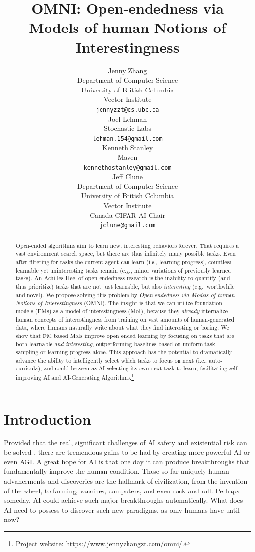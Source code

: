 \documentclass{article} %
\title{OMNI: Open-endedness via Models of human Notions of Interestingness}
\author{Jenny Zhang\\
Department of Computer Science\\
University of British Columbia\\
Vector Institute\\
\texttt{jennyzzt@cs.ubc.ca}\\
\And
Joel Lehman\\
Stochastic Labs\\
\texttt{lehman.154@gmail.com}\quad\quad\quad\quad\quad\quad\quad\\
\And
Kenneth Stanley\\
Maven\\
\texttt{kennethostanley@gmail.com}\\
\And
Jeff Clune\\
Department of Computer Science\\
University of British Columbia\\
Vector Institute\\
Canada CIFAR AI Chair\\
\texttt{jclune@gmail.com}\\
}
\newif\ifcomment
\begin{document}
\commentfalse

\maketitle

\begin{abstract}
Open-ended algorithms aim to learn new, interesting behaviors forever. That requires a vast environment search space, but there are thus infinitely many possible tasks. Even after filtering for tasks the current agent can learn (i.e., learning progress), countless learnable yet uninteresting tasks remain (e.g., minor variations of previously learned tasks). An Achilles Heel of open-endedness research is the inability to quantify (and thus prioritize) tasks that are not just learnable, but also \textit{interesting} (e.g., worthwhile and novel). We propose solving this problem by \textit{Open-endedness via Models of human Notions of Interestingness} (OMNI). The insight is that we can utilize foundation models (FMs) as a model of interestingness (MoI), because they \textit{already} internalize human concepts of interestingness from training on vast amounts of human-generated data, where humans naturally write about what they find interesting or boring. We show that FM-based MoIs improve open-ended learning by focusing on tasks that are both learnable \textit{and interesting}, outperforming baselines based on uniform task sampling or learning progress alone. This approach has the potential to dramatically advance the ability to intelligently select which tasks to focus on next (i.e., auto-curricula), and could be seen as AI selecting its own next task to learn, facilitating self-improving AI and AI-Generating Algorithms.\footnote{Project website: \url{https://www.jennyzhangzt.com/omni/}.}
\end{abstract}

\section{Introduction}
Provided that the real, significant challenges of AI safety and existential risk can be solved \citep{critch2020ai, bostrom2002a, turchin2020, ecoffet2020open}, there are tremendous gains to be had by creating more powerful AI or even AGI. A great hope for AI is that one day it can produce breakthroughs that fundamentally improve the human condition. These so-far uniquely human advancements and discoveries are the hallmark of civilization, from the invention of the wheel, to farming, vaccines, computers, and even rock and roll. Perhaps someday, AI could achieve such major breakthroughs automatically. What does AI need to possess to discover such new paradigms, as only humans have until now?
\end{document}
